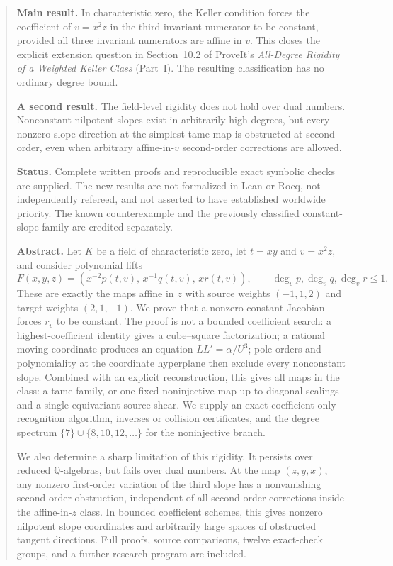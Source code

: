 \documentclass[11pt,a4paper]{article}
\numberwithin{equation}{section}
\theoremstyle{definition}
\theoremstyle{remark}
\newcommand{\Q}{\mathbb{Q}}
\begin{document}
\begin{quote}\small
\textbf{Main result.} In characteristic zero, the Keller condition forces
the coefficient of $v=x^2z$ in the third invariant numerator to be
constant, provided all three invariant numerators are affine in $v$. This
closes the explicit extension question in Section~10.2 of ProveIt's
\emph{All-Degree Rigidity of a Weighted Keller Class} (Part~I). The
resulting classification has no ordinary degree bound.

\textbf{A second result.} The field-level rigidity does not hold over dual
numbers. Nonconstant nilpotent slopes exist in arbitrarily high degrees,
but every nonzero slope direction at the simplest tame map is obstructed
at second order, even when arbitrary affine-in-$v$ second-order
corrections are allowed.

\textbf{Status.} Complete written proofs and reproducible exact symbolic
checks are supplied. The new results are not formalized in Lean or Rocq,
not independently refereed, and not asserted to have established
worldwide priority. The known counterexample and the previously
classified constant-slope family are credited separately.

\textbf{Abstract.} Let $K$ be a field of characteristic zero, let $t=xy$
and $v=x^2z$, and consider polynomial lifts
\[
F(x,y,z)=\left(x^{-2}p(t,v),\,x^{-1}q(t,v),\,xr(t,v)\right),
\qquad \deg_v p,\deg_v q,\deg_v r\leq1.
\]
These are exactly the maps affine in $z$ with source weights $(-1,1,2)$
and target weights $(2,1,-1)$. We prove that a nonzero constant Jacobian
forces $r_v$ to be constant. The proof is not a bounded coefficient
search: a highest-coefficient identity gives a cube--square
factorization; a rational moving coordinate produces an equation
$LL'=\alpha/U^3$; pole orders and polynomiality at the coordinate
hyperplane then exclude every nonconstant slope. Combined with an
explicit reconstruction, this gives all maps in the class: a tame family,
or one fixed noninjective map up to diagonal scalings and a single
equivariant source shear. We supply an exact coefficient-only recognition
algorithm, inverses or collision certificates, and the degree spectrum
$\{7\}\cup\{8,10,12,\ldots\}$ for the noninjective branch.

We also determine a sharp limitation of this rigidity. It persists over
reduced $\Q$-algebras, but fails over dual numbers. At the map $(z,y,x)$,
any nonzero first-order variation of the third slope has a nonvanishing
second-order obstruction, independent of all second-order corrections
inside the affine-in-$z$ class. In bounded coefficient schemes, this gives
nonzero nilpotent slope coordinates and arbitrarily large spaces of
obstructed tangent directions. Full proofs, source comparisons, twelve
exact-check groups, and a further research program are included.
\end{quote}
\end{document}
